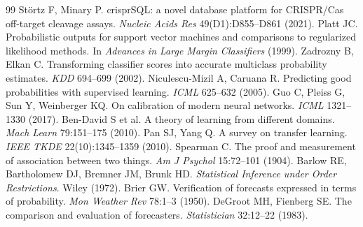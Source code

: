 \begin{thebibliography}{99}
 St\"ortz F, Minary P. crisprSQL: a novel database platform for CRISPR/Cas off-target cleavage assays. \emph{Nucleic Acids Res} 49(D1):D855--D861 (2021).
 Platt JC. Probabilistic outputs for support vector machines and comparisons to regularized likelihood methods. In \emph{Advances in Large Margin Classifiers} (1999).
 Zadrozny B, Elkan C. Transforming classifier scores into accurate multiclass probability estimates. \emph{KDD} 694--699 (2002).
 Niculescu-Mizil A, Caruana R. Predicting good probabilities with supervised learning. \emph{ICML} 625--632 (2005).
 Guo C, Pleiss G, Sun Y, Weinberger KQ. On calibration of modern neural networks. \emph{ICML} 1321--1330 (2017).
 Ben-David S et al. A theory of learning from different domains. \emph{Mach Learn} 79:151--175 (2010).
 Pan SJ, Yang Q. A survey on transfer learning. \emph{IEEE TKDE} 22(10):1345--1359 (2010).
 Spearman C. The proof and measurement of association between two things. \emph{Am J Psychol} 15:72--101 (1904).
 Barlow RE, Bartholomew DJ, Bremner JM, Brunk HD. \emph{Statistical Inference under Order Restrictions}. Wiley (1972).
 Brier GW. Verification of forecasts expressed in terms of probability. \emph{Mon Weather Rev} 78:1--3 (1950).
 DeGroot MH, Fienberg SE. The comparison and evaluation of forecasters. \emph{Statistician} 32:12--22 (1983).
\end{thebibliography}
